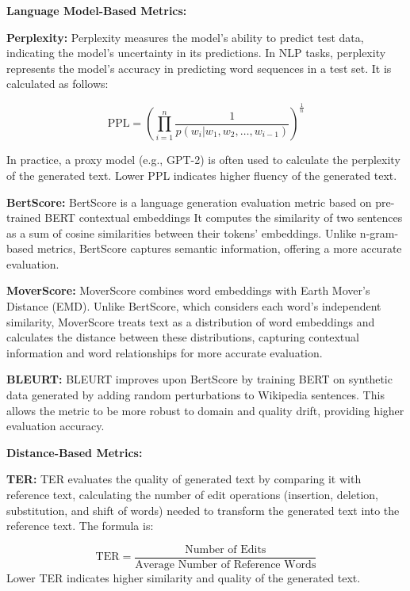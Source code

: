 \documentclass[acmsmall, screen]{acmart}
\begin{document}
\textbf{Language Model-Based Metrics:} 

\textbf{Perplexity\cite{jozefowicz_arxiv16_perplexity}:} Perplexity measures the model's ability to predict test data, indicating the model's uncertainty in its predictions. In NLP tasks, perplexity represents the model's accuracy in predicting word sequences in a test set. It is calculated as follows:

\begin{equation}
\text{PPL} = \left( \prod_{i=1}^{n} \frac{1}{p(w_i | w_1, w_2, \ldots, w_{i-1})} \right)^{\frac{1}{n}}
\end{equation}

In practice, a proxy model (e.g., GPT-2) is often used to calculate the perplexity of the generated text. Lower PPL indicates higher fluency of the generated text.

\textbf{BertScore\cite{zhang_iclr20_bertscore}:} BertScore is a language generation evaluation metric based on pre-trained BERT contextual embeddings It computes the similarity of two sentences as a sum of cosine similarities between their tokens’ embeddings. Unlike n-gram-based metrics, BertScore captures semantic information, offering a more accurate evaluation.

\textbf{MoverScore\cite{zhao_emnlp19_moverscore}:} MoverScore combines word embeddings with Earth Mover's Distance (EMD). Unlike BertScore, which considers each word's independent similarity, MoverScore treats text as a distribution of word embeddings and calculates the distance between these distributions, capturing contextual information and word relationships for more accurate evaluation.

\textbf{BLEURT\cite{sellam_acl20_bleurt}:} BLEURT improves upon BertScore by training BERT on synthetic data generated by adding random perturbations to Wikipedia sentences. This allows the metric to be more robust to domain and quality drift, providing higher evaluation accuracy.

\textbf{Distance-Based Metrics:} 

\textbf{TER\cite{snover_amta06_ter}:} TER evaluates the quality of generated text by comparing it with reference text, calculating the number of edit operations (insertion, deletion, substitution, and shift of words) needed to transform the generated text into the reference text. The formula is:

\begin{equation}
\text{TER} = \frac{\text{Number of Edits}}{\text{Average Number of Reference Words}}
\end{equation}
Lower TER indicates higher similarity and quality of the generated text.
\end{document}
